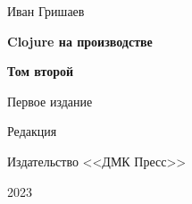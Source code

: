 
\begin{titlepage}

\begin{center}

  {Иван Гришаев}

  \vspace*{5cm}

  {\Large\textbf{Clojure на производстве}}

  \vspace{1mm}

  {\Large\textbf{Том второй}}

  \vspace{7mm}

  {\Large Первое издание}

  {\small Редакция \COMMITHASH}

  \vspace*{\fill}

  \ifdmk
  Издательство <<ДМК Пресс>>
  \fi

  {2023}

\end{center}

\end{titlepage}
